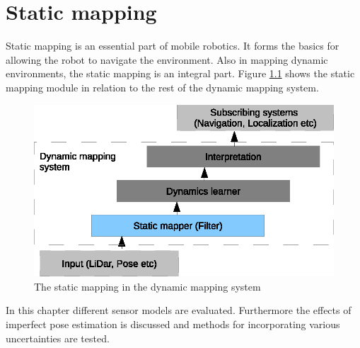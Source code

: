 \chapter{Static mapping}
Static mapping is an essential part of mobile robotics. It forms the basics for allowing the robot to navigate the environment. 
Also in mapping dynamic environments, the static mapping is an integral part. Figure \ref{fig:static_map_overview} shows the static mapping module in relation to the rest of the dynamic mapping system.  

\begin{figure}[htbp]
		\centering
		\includegraphics[scale=1]{chapters/static_mapping/figures/static_map_overview.eps}
		\caption{The static mapping in the dynamic mapping system}
		\label{fig:static_map_overview}
\end{figure}

In this chapter different sensor models are evaluated. Furthermore the effects of imperfect pose estimation is discussed and methods for incorporating various uncertainties are tested. 





